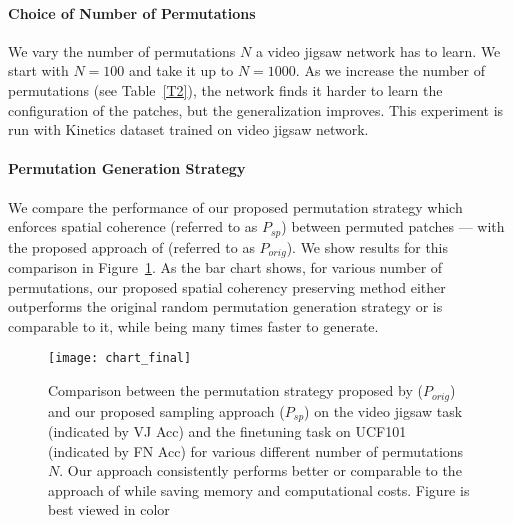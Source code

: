 \documentclass[10pt,twocolumn,letterpaper]{article}
\begin{document}
\vspace{-3mm}
\paragraph{\textbf{Choice of Number of Permutations}}
We vary the number of permutations $N$ a video jigsaw network has to learn. We start with $N = 100$ and take it up to $N = 1000$. As we increase the number of permutations (see Table~\ref{T2}), the network finds it harder to learn the configuration of the patches, but the generalization improves. This experiment is run with Kinetics dataset trained on video jigsaw network. 

\begin{table}[t]
\makegapedcells
\centering
{}
\caption{As we increase $N$, the video jigsaw performance decreases but the finetuning accuracy increases}
\label{T2}

\end{table}
\vspace{-3mm}
\paragraph{\textbf{Permutation Generation Strategy}}
We compare the performance of our proposed permutation strategy which enforces spatial coherence (referred to as $P_{sp}$) between permuted patches --- with the proposed approach of \cite{noroozi2016unsupervised} (referred to as $P_{orig}$). We show results for this comparison in Figure~\ref{fig4}. As the bar chart shows, for various number of permutations, our proposed spatial coherency preserving method either outperforms the original random permutation generation strategy or is comparable to it, while being many times faster to generate. 

\begin{figure}[b!]
\centering
\texttt{[image: chart\_final]}
\caption{Comparison between the permutation strategy proposed by \cite{noroozi2016unsupervised} ($P_{orig}$) and our proposed sampling approach ($P_{sp}$) on the video jigsaw task (indicated by VJ Acc) and the finetuning task on UCF101 (indicated by FN Acc) for various different number of permutations $N$. Our approach consistently performs better or comparable to the approach of \cite{noroozi2016unsupervised} while saving memory and computational costs. Figure is best viewed in color}
\label{fig4}
\end{figure}
\end{document}
